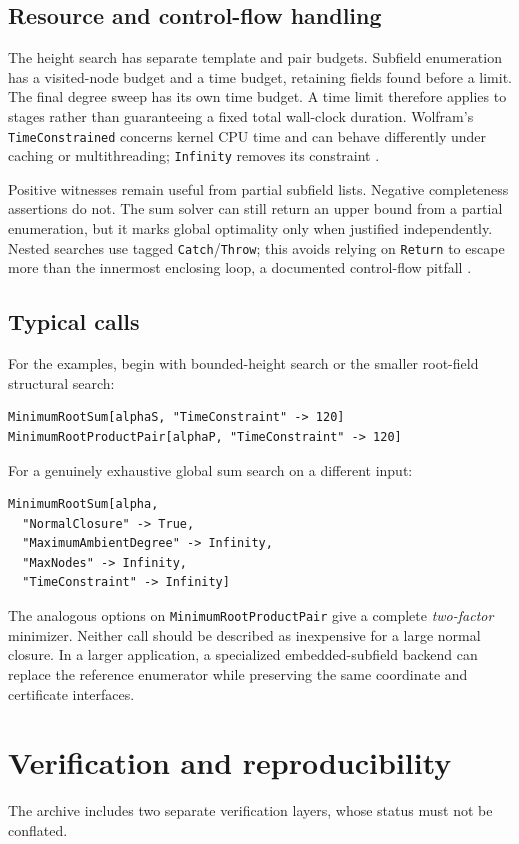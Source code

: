 \documentclass[11pt,a4paper]{article}
\theoremstyle{definition}\newtheorem{definition}[theorem]{Definition}
\theoremstyle{remark}\newtheorem{remark}[theorem]{Remark}
\newcommand{\wl}[1]{\texttt{#1}}
\begin{document}
\subsection{Resource and control-flow handling}
The height search has separate template and pair budgets. Subfield enumeration has a visited-node budget and a time budget, retaining fields found before a limit. The final degree sweep has its own time budget. A time limit therefore applies to stages rather than guaranteeing a fixed total wall-clock duration. Wolfram's \wl{TimeConstrained} concerns kernel CPU time and can behave differently under caching or multithreading; \wl{Infinity} removes its constraint \cite{timeconstrained}.

Positive witnesses remain useful from partial subfield lists. Negative completeness assertions do not. The sum solver can still return an upper bound from a partial enumeration, but it marks global optimality only when justified independently. Nested searches use tagged \wl{Catch}/\wl{Throw}; this avoids relying on \wl{Return} to escape more than the innermost enclosing loop, a documented control-flow pitfall \cite{return}.

\subsection{Typical calls}
For the examples, begin with bounded-height search or the smaller root-field structural search:
\begin{lstlisting}
MinimumRootSum[alphaS, "TimeConstraint" -> 120]
MinimumRootProductPair[alphaP, "TimeConstraint" -> 120]
\end{lstlisting}
For a genuinely exhaustive global sum search on a different input:
\begin{lstlisting}
MinimumRootSum[alpha,
  "NormalClosure" -> True,
  "MaximumAmbientDegree" -> Infinity,
  "MaxNodes" -> Infinity,
  "TimeConstraint" -> Infinity]
\end{lstlisting}
The analogous options on \wl{MinimumRootProductPair} give a complete \emph{two-factor} minimizer. Neither call should be described as inexpensive for a large normal closure. In a larger application, a specialized embedded-subfield backend can replace the reference enumerator while preserving the same coordinate and certificate interfaces.

\section{Verification and reproducibility}
\label{sec:verification}
The archive includes two separate verification layers, whose status must not be conflated.
\end{document}
